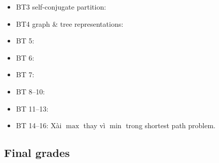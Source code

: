 \documentclass{article}
\begin{document}
\begin{enumerate}
\begin{itemize}
\begin{itemize}
            \item BT3 self-conjugate partition:
            \item BT4 graph \& tree representations:
            \item BT 5:
            \item BT 6:
            \item BT 7:
            \item BT 8--10:
            \item BT 11--13:
            \item BT 14--16: Xài $\max$ thay vì $\min$ trong shortest path problem.
        \end{itemize}
    \end{itemize}
\end{enumerate}


\subsection{Final grades}
\end{document}
